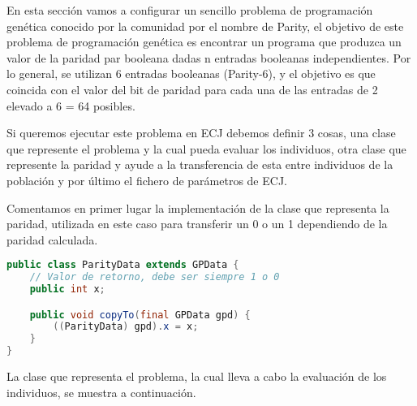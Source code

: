 \label{desarrollo-parity}
En esta sección vamos a configurar un sencillo problema de programación genética conocido por la comunidad por el nombre de Parity, el objetivo de este problema de programación genética es encontrar un programa que produzca un valor de la paridad par booleana dadas n entradas booleanas independientes. Por lo general, se utilizan 6 entradas booleanas (Parity-6), y el objetivo es que coincida con el valor del bit de paridad para cada una de las entradas de 2 elevado a 6 = 64 posibles.

Si queremos ejecutar este problema en ECJ debemos definir 3 cosas, una clase que represente el problema y la cual pueda evaluar los individuos, otra clase que represente la paridad y ayude a la transferencia de esta entre individuos de la población y por \'ultimo el fichero de par\'ametros de ECJ.

Comentamos en primer lugar la implementación de la clase que representa la paridad, utilizada en este caso para transferir un 0 o un 1 dependiendo de la paridad calculada.

\begin{lstlisting}[language=Java]
public class ParityData extends GPData {
	// Valor de retorno, debe ser siempre 1 o 0
	public int x;

	public void copyTo(final GPData gpd) {
		((ParityData) gpd).x = x;
	}
}
\end{lstlisting}

La clase que representa el problema, la cual lleva a cabo la evaluaci\'on de los individuos, se muestra a continuación.

